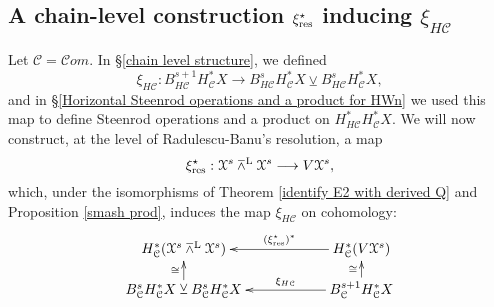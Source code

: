 \documentclass[11pt]{amsart} \renewcommand{\baselinestretch}{1.2}
\theoremstyle{plain}
\theoremstyle{definition}
\renewcommand{\to}{\longrightarrow}
\newcommand{\from}{\longleftarrow}
\newcommand{\scrC}{\mathscr{C}}
\newcommand{\calx}{\mathcal{X}}
\newcommand{\calc}{\mathcal{C}}
\newcommand{\HA}[1]{H#1}
\newcommand{\algs}{{\scrC\!\textit{om}}}
\newcommand{\Lsmashprod}{\barwedge^\mathrm{L}}%
\newcommand{\smashcoprod}{\veebar}%
\begin{document}
\begin{Operations on the Bousfield-Kan spectral sequence}
\subsection{A chain-level construction $\xi_\textup{res}^\star$ inducing $\xi_{\HA{\calc}}$}\label{sec xires}
Let $\calc=\algs$. In \S\ref{chain level structure}, we defined
\[\xi_{\HA{\calc}}:B^{s+1}_{\HA{\calc}}H^*_{\calc}X\to B^{s}_{\HA{\calc}}H^*_{\calc}X\smashcoprod B^{s}_{\HA{\calc}}H^*_{\calc}X,\]
and in \S\ref{Horizontal Steenrod operations and a product for HWn} we used this map to define Steenrod operations and a product on $H^{*}_{\HA{\calc}}H^*_{\calc}X$. 
We will now construct, at the level of Radulescu-Banu's resolution, a map
\[\xi_\textup{res}^\star:\calx^s\Lsmashprod \calx^s\to V\calx^s,\]
which, under the isomorphisms of Theorem \ref{identify E2 with derived Q} and Proposition \ref{smash prod}, induces the map $\xi_{\HA{\calc}}$ on cohomology:
\[\xymatrix@R=4mm@C=20mm{
H^*_{\calc}(\calx^s\Lsmashprod \calx^s)&\ar[l]_-{(\xi_\textup{res}^\star)^*}
H^*_{\calc}(V\calx^s)\\%
B^{s}_\calc H^*_\calc X\smashcoprod B^{s}_\calc H^*_\calc X\ar[u]^-{\cong}&%
B^{s+1}_\calc H^*_\calc X\ar[l]_-{\xi_{\HA{\calc}}}\ar[u]^-{\cong}%
}\]



\end{Operations on the Bousfield-Kan spectral sequence}
\end{document}
